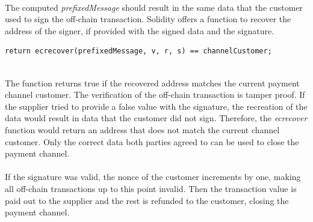 \leavevmode
\\
The computed \textit{prefixedMessage} should result in the same data that the customer used to sign the off-chain transaction.
Solidity offers a function to recover the address of the signer, if provided with the signed data and the signature.
\\
\begin{lstlisting}[language=Solidity, numbers=none]
return ecrecover(prefixedMessage, v, r, s) == channelCustomer;
\end{lstlisting}
\leavevmode
\\
The function returns true if the recovered address matches the current payment channel customer.
The verification of the off-chain transaction is tamper proof.
If the supplier tried to provide a false value with the signature, the recreation of the data would result in data that the customer did not sign.
Therefore, the \textit{ecrecover} function would return an address that does not match the current channel customer.
Only the correct data both parties agreed to can be used to close the payment channel.
\\\\
If the signature was valid, the nonce of the customer increments by one, making all off-chain transactions up to this point invalid.
Then the transaction value is paid out to the supplier and the rest is refunded to the customer, closing the payment channel.
\newpage
